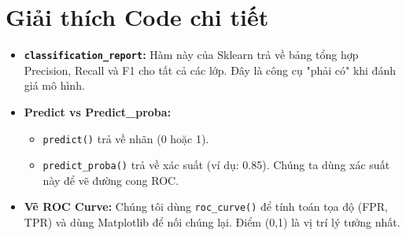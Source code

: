 \documentclass{article}
\begin{document}
\section{Giải thích Code chi tiết}
\begin{itemize}
    \item \textbf{\texttt{classification\_report}:} Hàm này của Sklearn trả về bảng tổng hợp Precision, Recall và F1 cho tất cả các lớp. Đây là công cụ "phải có" khi đánh giá mô hình.
    \item \textbf{Predict vs Predict\_proba:} 
    \begin{itemize}
        \item \texttt{predict()} trả về nhãn (0 hoặc 1).
        \item \texttt{predict\_proba()} trả về xác suất (ví dụ: 0.85). Chúng ta dùng xác suất này để vẽ đường cong ROC.
    \end{itemize}
    \item \textbf{Vẽ ROC Curve:} Chúng tôi dùng \texttt{roc\_curve()} để tính toán tọa độ (FPR, TPR) và dùng Matplotlib để nối chúng lại. Điểm (0,1) là vị trí lý tưởng nhất.
\end{itemize}
\end{document}
